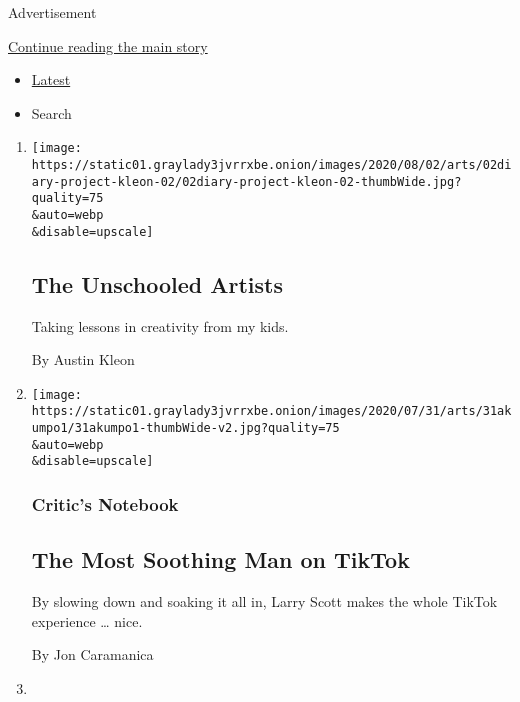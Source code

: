 Advertisement

\protect\hyperlink{after-mid1}{Continue reading the main story}

\begin{itemize}
\tightlist
\item
  \protect\hyperlink{stream-panel}{Latest}
\item
  Search
\end{itemize}

\begin{enumerate}
\def\labelenumi{\arabic{enumi}.}
\item
  \href{/2020/07/31/arts/quarantine-parenting-art.html}{}

  \texttt{[image: https://static01.graylady3jvrrxbe.onion/images/2020/08/02/arts/02diary-project-kleon-02/02diary-project-kleon-02-thumbWide.jpg?quality=75\\\&auto=webp\\\&disable=upscale]}

  \hypertarget{the-unschooled-artists}{%
  \subsection{The Unschooled Artists}\label{the-unschooled-artists}}

  Taking lessons in creativity from my kids.

  By Austin Kleon
\item
  \href{/2020/07/31/arts/larry-scott-tiktok-larryakumpo.html}{}

  \texttt{[image: https://static01.graylady3jvrrxbe.onion/images/2020/07/31/arts/31akumpo1/31akumpo1-thumbWide-v2.jpg?quality=75\\\&auto=webp\\\&disable=upscale]}

  \hypertarget{critics-notebook-1}{%
  \subsubsection{Critic's Notebook}\label{critics-notebook-1}}

  \hypertarget{the-most-soothing-man-on-tiktok}{%
  \subsection{The Most Soothing Man on
  TikTok}\label{the-most-soothing-man-on-tiktok}}

  By slowing down and soaking it all in, Larry Scott makes the whole
  TikTok experience \ldots{} nice.

  By Jon Caramanica
\item
  \href{/2020/07/31/books/review/crime-fiction-megan-miranda.html}{}


\end{enumerate}
